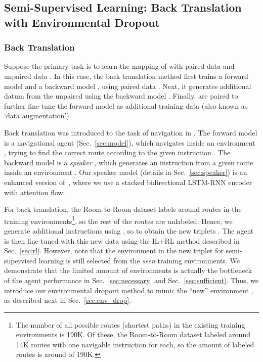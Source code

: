 \documentclass[11pt,a4paper]{article}
\begin{document}
\subsection{Semi-Supervised Learning: Back Translation with Environmental Dropout}
\label{sec:ssl}


\subsubsection{Back Translation}  
\label{sec:back_translation}
Suppose the primary task is to learn the mapping of  with paired data  and unpaired data .
In this case, the back translation method first trains a forward model  and a backward model , using paired data .
Next, it generates additional datum  from the unpaired  using the backward model .
Finally,  are paired to further fine-tune the forward model  as additional training data (also known as `data augmentation').

Back translation was introduced to the task of navigation in . 
The forward model is a navigational agent  (Sec.~\ref{sec:model}), which navigates inside an environment , trying to find the correct route  according to the given instruction .
The backward model is a \emph{speaker} , 
which generates an instruction  from a given route  inside an environment . 
Our speaker model (details in Sec.~\ref{sec:speaker}) is an enhanced version of~, where we use a stacked bidirectional LSTM-RNN encoder with attention flow.


For back translation, the Room-to-Room dataset labels around  routes  in the training environments\footnote{The number of all possible routes (shortest paths) in the  existing training environments is 190K. Of these, the Room-to-Room dataset labeled around 14K routes with one navigable instruction for each, so the amount of labeled routes is around  of 190K.}, so the rest of the routes  are unlabeled.
Hence, we generate additional instructions  using  , so to obtain the new triplets . 
The agent is then fine-tuned with this new data using the IL+RL method described in Sec.~\ref{sec:rl}. However, note that the environment  in the new triplet  for semi-supervised learning is still selected from the \emph{seen} training environments. 
We demonstrate that the limited amount of environments  is actually the bottleneck of the agent performance in  Sec.~\ref{sec:necessary} and Sec.~\ref{sec:sufficient}.
Thus, we introduce our environmental dropout method to mimic the ``new'' environment , as described next in Sec.~\ref{sec:env_drop}.
\end{document}
